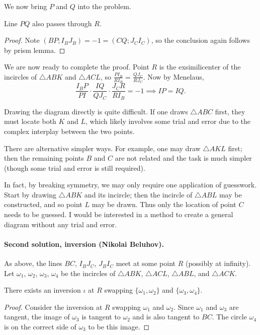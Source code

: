 \documentclass[11pt]{scrartcl}
\begin{document}
We now bring $P$ and $Q$ into the problem.
\begin{claim*}
  Line $PQ$ also passes through $R$.
\end{claim*}

\begin{proof}
  Note $(BP; I_BJ_B) = -1 = (CQ; J_CI_C)$,
  so the conclusion again follows by prism lemma.
\end{proof}


We are now ready to complete the proof.
Point $R$ is the exsimilicenter of
the incircles of $\triangle ABK$ and $\triangle ACL$,
so $\tfrac{PI_B}{RI_B} = \tfrac{QJ_C}{RJ_C}$.
Now by Menelaus,
\[\frac{I_BP}{PI} \cdot \frac{IQ}{QJ_C} \cdot \frac{J_CR}{RI_B} = -1
\implies IP = IQ.\]

\begin{remark*}
  Drawing the diagram directly is quite difficult.
  If one draws $\triangle ABC$ first,
  they must locate both $K$ and $L$,
  which likely involves some trial and error
  due to the complex interplay between the two points.

  There are alternative simpler ways.
  For example, one may draw $\triangle AKL$ first;
  then the remaining points $B$ and $C$ are not related
  and the task is much simpler
  (though some trial and error is still required).

  In fact, by breaking symmetry,
  we may only require one application of guesswork.
  Start by drawing $\triangle ABK$ and its incircle;
  then the incircle of $\triangle ABL$ may be constructed,
  and so point $L$ may be drawn.
  Thus only the location of point $C$ needs to be guessed.
  I would be interested in a method
  to create a general diagram without any trial and error.
\end{remark*}

\paragraph{Second solution, inversion (Nikolai Beluhov).}
As above, the lines $BC$, $I_BJ_C$, $J_BI_C$ meet at some point $R$
(possibly at infinity).
Let $\omega_1$, $\omega_2$, $\omega_3$, $\omega_4$ be the incircles
of $\triangle ABK$, $\triangle ACL$, $\triangle ABL$, and $\triangle ACK$.
\begin{claim*}
    There exists an inversion $\iota$ at $R$
    swapping $\{\omega_1, \omega_2\}$
    and $\{\omega_3, \omega_4\}$.
\end{claim*}
\begin{proof}
    Consider the inversion at $R$
    swapping $\omega_1$ and $\omega_2$.
    Since $\omega_1$ and $\omega_3$ are tangent,
    the image of $\omega_3$ is tangent to $\omega_2$
    and is also tangent to $BC$.
    The circle $\omega_4$ is on the correct side of $\omega_3$
    to be this image.
\end{proof}
\end{document}
